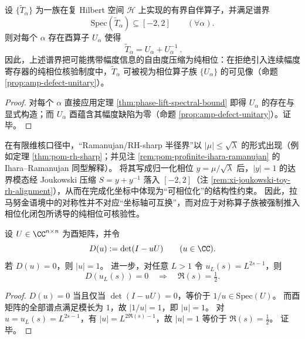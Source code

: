 \begin{theorem}\label{thm:ramanujan-phase-lift-principle}
设 \(\{\widetilde T_\alpha\}\) 为一族在复 Hilbert 空间 \(\mathcal H\) 上实现的有界自伴算子，并满足谱界
\[
\mathrm{Spec}(\widetilde T_\alpha)\subseteq[-2,2]\qquad(\forall \alpha).
\]
则对每个 \(\alpha\) 存在酉算子 \(U_\alpha\) 使得
\[
\boxed{\ \widetilde T_\alpha=U_\alpha+U_\alpha^{-1}\ }.
\]
因此，上述谱界把可能携带幅度信息的自由度压缩为纯相位：在拒绝引入连续幅度寄存器的纯相位核验制度中，\(\widetilde T_\alpha\) 可被视为相位算子族 \(\{U_\alpha\}\) 的可见像（命题 \ref{prop:amp-defect-unitary}）。
\end{theorem}
\begin{proof}
对每个 \(\alpha\) 直接应用定理 \ref{thm:phase-lift-spectral-bound} 即得 \(U_\alpha\) 的存在与显式构造；而 \(U_\alpha\) 酉蕴含其幅度缺陷为零（命题 \ref{prop:amp-defect-unitary}）。证毕。
\end{proof}

\begin{remark}\label{rem:ramanujan-phase-lift-kernel}
在有限维核口径中，“Ramanujan/RH-sharp 半径界”以 \(|\mu|\le\sqrt{\lambda}\) 的形式出现（例如定理 \ref{thm:pom-rh-sharp}；并见注 \ref{rem:pom-profinite-ihara-ramanujan} 的 Ihara--Ramanujan 同型解释）。
将其写成归一化相位 \(y=\mu/\sqrt{\lambda}\) 后，\(|y|=1\) 的达界模态经 Joukowski 压缩 \(S=y+y^{-1}\) 落入 \([-2,2]\)（注 \ref{rem:xi-joukowski-toy-rh-alignment}），从而在完成化坐标中体现为“可相位化”的结构性约束。
因此，拉马努金语境中的对称性并不对应“坐标轴可互换”，而对应于对称算子族被强制推入相位化闭包所诱导的纯相位可核验性。
\end{remark}

\begin{proposition}[酉行列式的零点定位：\texorpdfstring{$|u|=1$}{|u|=1}]\label{prop:unitary-determinant-zero-unit-circle}
设 \(U\in\CC^{n\times n}\) 为酉矩阵，并令
\[
D(u):=\det(I-uU)\qquad(u\in\CC).
\]
若 \(D(u)=0\)，则 \(|u|=1\)。
进一步，对任意 \(L>1\) 令 \(u_L(s)=L^{2s-1}\)，则
\[
D(u_L(s))=0\quad\Longrightarrow\quad \Re(s)=\tfrac12.
\]
\end{proposition}
\begin{proof}
\(D(u)=0\) 当且仅当 \(\det(I-uU)=0\)，等价于 \(1/u\in\mathrm{Spec}(U)\)。
而酉矩阵的全部谱点满足模长为 \(1\)，故 \(|1/u|=1\)，即 \(|u|=1\)。
对 \(u=u_L(s)=L^{2s-1}\)，有 \(|u|=L^{2\Re(s)-1}\)，故 \(|u|=1\) 等价于 \(\Re(s)=\tfrac12\)。
证毕。
\end{proof}

